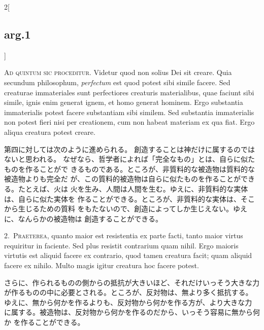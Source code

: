 \documentclass[paper=a4paper,fontsize=10pt,jafontsize=9pt,titlepage]{jlreq}
\begin{document}
\begin{paracol}{2}[\subsection{arg.1}]

{\huge A}{\scshape d quintum sic proceditur}. Videtur quod non solius
 Dei sit creare. Quia secundum philosophum, {\itshape perfectum} est
 quod potest sibi simile facere. Sed creaturae immateriales sunt
 perfectiores creaturis materialibus, quae faciunt sibi simile, ignis
 enim generat ignem, et homo generat hominem. Ergo substantia
 immaterialis potest facere substantiam sibi similem. Sed substantia
 immaterialis non potest fieri nisi per creationem, cum non habeat
 materiam ex qua fiat. Ergo aliqua creatura potest creare.

\switchcolumn

第四に対しては次のように進められる。
創造することは神だけに属するのではないと思われる。
なぜなら、哲学者によれば「完全なもの」とは、自らに似たものを作ることがで
 きるものである。ところが、非質料的な被造物は質料的な被造物よりも完全だ
 が、この質料的被造物は自らに似たものを作ることができる。たとえば、火は
 火を生み、人間は人間を生む。ゆえに、非質料的な実体は、自らに似た実体を
 作ることができる。ところが、非質料的な実体は、そこから生じるための質料
 をもたないので、創造によってしか生じえない。ゆえに、なんらかの被造物は
 創造することができる。


2.~{\scshape Praeterea}, quanto maior est resistentia ex
 parte facti, tanto maior virtus requiritur in faciente. Sed plus
 resistit contrarium quam nihil. Ergo maioris virtutis est aliquid
 facere ex contrario, quod tamen creatura facit; quam aliquid facere ex
 nihilo. Multo magis igitur creatura hoc facere potest.

\switchcolumn

さらに、作られるものの側からの抵抗が大きいほど、それだけいっそう大きな力
 が作るものの中に必要とされる。ところが、反対物は、無より多く抵抗する。
 ゆえに、無から何かを作るよりも、反対物から何かを作る方が、より大きな力
 に属する。被造物は、反対物から何かを作るのだから、いっそう容易に無から何か
 を作ることができる。



\end{paracol}
\end{document}
